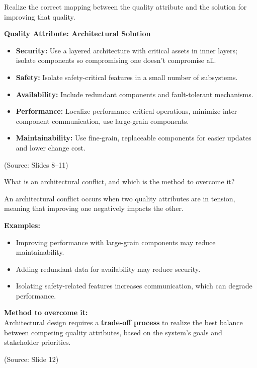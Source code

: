 \documentclass[12pt]{article}
\begin{document}
\begin{questionbox}
Realize the correct mapping between the quality attribute and the solution for improving that quality.
\end{questionbox}

\textbf{Quality Attribute: Architectural Solution}
\begin{itemize}
    \item \textbf{Security:} Use a layered architecture with critical assets in inner layers; isolate components so compromising one doesn't compromise all.
    \item \textbf{Safety:} Isolate safety-critical features in a small number of subsystems.
    \item \textbf{Availability:} Include redundant components and fault-tolerant mechanisms.
    \item \textbf{Performance:} Localize performance-critical operations, minimize inter-component communication, use large-grain components.
    \item \textbf{Maintainability:} Use fine-grain, replaceable components for easier updates and lower change cost.
\end{itemize}

(Source: Slides 8--11)

\begin{questionbox}
What is an architectural conflict, and which is the method to overcome it?
\end{questionbox}

An architectural conflict occurs when two quality attributes are in tension, meaning that improving one negatively impacts the other.

\textbf{Examples:}
\begin{itemize}
    \item Improving performance with large-grain components may reduce maintainability.
    \item Adding redundant data for availability may reduce security.
    \item Isolating safety-related features increases communication, which can degrade performance.
\end{itemize}

\textbf{Method to overcome it:}\\
Architectural design requires a \textbf{trade-off process} to realize the best balance between competing quality attributes, based on the system's goals and stakeholder priorities.

(Source: Slide 12)
\end{document}
